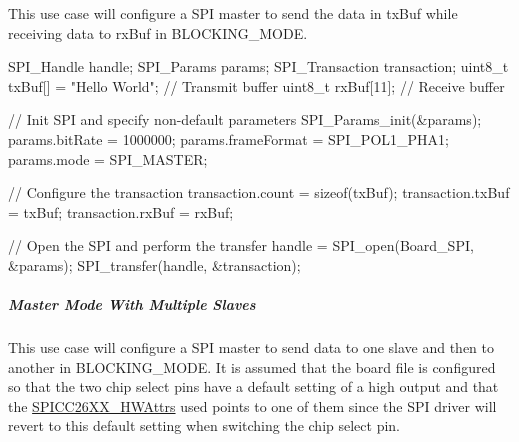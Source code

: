 This use case will configure a S\+P\+I master to send the data in tx\+Buf while receiving data to rx\+Buf in B\+L\+O\+C\+K\+I\+N\+G\+\_\+\+M\+O\+D\+E. 
\begin{DoxyCode}
SPI_Handle handle;
SPI_Params params;
SPI_Transaction transaction;
uint8\_t txBuf[] = \textcolor{stringliteral}{"Hello World"};    \textcolor{comment}{// Transmit buffer}
uint8\_t rxBuf[11];                  \textcolor{comment}{// Receive buffer}

\textcolor{comment}{// Init SPI and specify non-default parameters}
SPI_Params_init(&params);
params.bitRate     = 1000000;
params.frameFormat = SPI_POL1_PHA1;
params.mode        = SPI_MASTER;

\textcolor{comment}{// Configure the transaction}
transaction.count = \textcolor{keyword}{sizeof}(txBuf);
transaction.txBuf = txBuf;
transaction.rxBuf = rxBuf;

\textcolor{comment}{// Open the SPI and perform the transfer}
handle = SPI_open(Board\_SPI, &params);
SPI_transfer(handle, &transaction);
\end{DoxyCode}


\subparagraph*{Master Mode With Multiple Slaves\label{_s_p_i_c_c26_x_x_d_m_a_8h_USE_CASE_MMMS}%
\hypertarget{_s_p_i_c_c26_x_x_d_m_a_8h_USE_CASE_MMMS}{}%
}

This use case will configure a S\+P\+I master to send data to one slave and then to another in B\+L\+O\+C\+K\+I\+N\+G\+\_\+\+M\+O\+D\+E. It is assumed that the board file is configured so that the two chip select pins have a default setting of a high output and that the \hyperlink{struct_s_p_i_c_c26_x_x___h_w_attrs}{S\+P\+I\+C\+C26\+X\+X\+\_\+\+H\+W\+Attrs} used points to one of them since the S\+P\+I driver will revert to this default setting when switching the chip select pin.


